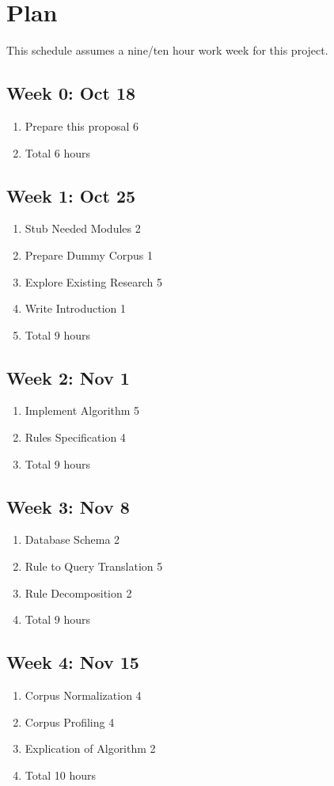 \documentclass[10pt]{article}
\begin{document}
\section{Plan}
This schedule assumes a nine/ten hour work week for this project.

\subsection{Week 0: Oct 18}
\begin{enumerate}
\item Prepare this proposal 6
\item Total 6 hours
\end{enumerate}

\subsection{Week 1: Oct 25}
\begin{enumerate}
\item Stub Needed Modules 2
\item Prepare Dummy Corpus 1
\item Explore Existing Research 5
\item Write Introduction 1
\item Total 9 hours
\end{enumerate}

\subsection{Week 2: Nov 1}
\begin{enumerate}
\item Implement Algorithm 5
\item Rules Specification 4 
\item Total 9 hours
\end{enumerate}

\subsection{Week 3: Nov 8}
\begin{enumerate}
\item Database Schema 2
\item Rule to Query Translation 5
\item Rule Decomposition 2
\item Total 9 hours
\end{enumerate}

\subsection{Week 4: Nov 15}
\begin{enumerate}
\item Corpus Normalization 4
\item Corpus Profiling 4
\item Explication of Algorithm 2
\item Total 10 hours
\end{enumerate}
\end{document}
